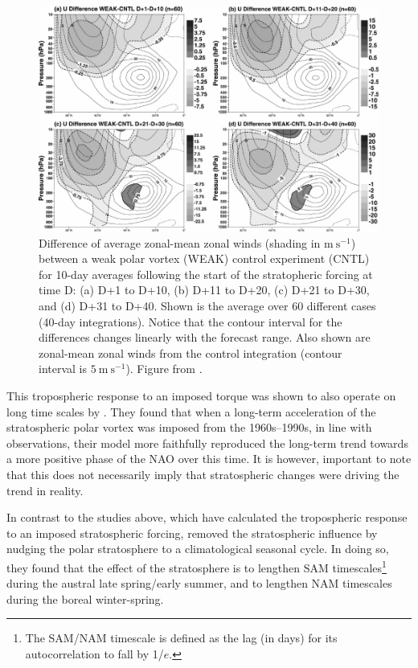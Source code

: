 \begin{figure}
 \centering
 \noindent\includegraphics[width=\textwidth]{figures/chapter-intro/Jung_Barkmeijer.pdf}
 \caption[Numerical simulation results from \citet{Jung2006}]{Difference of
   average zonal-mean zonal winds (shading in $\mathrm{m~s^{-1}}$) between a
   weak polar vortex (WEAK) control experiment (CNTL) for 10-day averages
   following the start of the stratopheric forcing at time D: (a) D+1 to D+10,
   (b) D+11 to D+20, (c) D+21 to D+30, and (d) D+31 to D+40. Shown is the
   average over 60 different cases (40-day integrations). Notice that the
   contour interval for the differences changes linearly with the forecast
   range. Also shown are zonal-mean zonal winds from the control integration
   (contour interval is $\mathrm{5~m~s^{-1}}$). Figure from \citet{Jung2006}.}
 \label{fig:jung_barkmeijer}
\end{figure}

This tropospheric response to an imposed torque was shown to also operate on
long time scales by \citet{Scaife2005}. They found that when a long-term
acceleration of the stratospheric polar vortex was imposed from the
1960s--1990s, in line with observations, their model more faithfully reproduced
the long-term trend towards a more positive phase of the NAO over this time. It
is however, important to note that this does not necessarily imply that
stratospheric changes were driving the trend in reality.

In contrast to the studies above, which have calculated the tropospheric
response to an imposed stratospheric forcing, \citet{Simpson2011} removed the
stratospheric influence by nudging the polar stratosphere to a climatological
seasonal cycle. In doing so, they found that the effect of the stratosphere is
to lengthen SAM timescales\footnote{The SAM/NAM timescale is defined as the lag
  (in days) for its autocorrelation to fall by 1/$e$.} during the austral late
spring/early summer, and to lengthen NAM timescales during the boreal
winter-spring.

